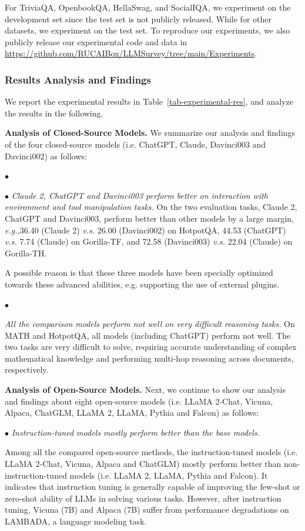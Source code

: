 {{For TriviaQA, OpenbookQA, HellaSwag, and SocialIQA, we experiment on the development set since the test set is not publicly released. While for other datasets, we experiment on the test set. To reproduce our experiments, we also publicly release our experimental code and data in \url{https://github.com/RUCAIBox/LLMSurvey/tree/main/Experiments}. 

\subsubsection{Results Analysis and Findings} We report the experimental results in Table~\ref{tab-experimental-res}, and analyze the results in the following.

\textbf{Analysis of Closed-Source Models.} We summarize our analysis and findings of  {the four} closed-source models (i.e. ChatGPT, Claude, Davinci003 and Davinci002) as follows:

$\bullet$ 

$\bullet$ \emph{{Claude 2, ChatGPT and Davinci003} perform better on interaction with environment and tool manipulation tasks.} On the two evaluation tasks, Claude 2, ChatGPT and Davinci003, perform better than other models by a large margin, \emph{e.g.,}36.40 (Claude 2) \emph{v.s.} 26.00 (Davinci002) on HotpotQA, 44.53 (ChatGPT) \emph{v.s.} 7.74 (Claude) on Gorilla-TF, and 72.58 (Davinci003) \emph{v.s.} 22.04 (Claude) on Gorilla-TH. 

{A possible reason is that these three models have been specially optimized towards these advanced abilities, e.g. supporting the use of external plugins.  }

$\bullet$ 

\emph{All the comparison models perform not well on very difficult reasoning tasks.} On MATH and HotpotQA, all models (including ChatGPT) perform not well. The two tasks are very difficult to solve, requiring accurate understanding of complex mathematical knowledge and performing multi-hop reasoning across documents, respectively.

\textbf{Analysis of Open-Source Models.} Next, we continue to show our analysis and findings about eight open-source models (i.e. LLaMA 2-Chat, Vicuna, Alpaca, ChatGLM, LLaMA 2, LLaMA, Pythia and Falcon) as follows: 

$\bullet$ \emph{Instruction-tuned models mostly perform better than the base models.} 

{Among all the compared open-source methods, the instruction-tuned models (i.e. LLaMA 2-Chat, Vicuna, Alpaca and ChatGLM) mostly perform better than  non-instruction-tuned models (i.e. LLaMA 2, LLaMA, Pythia and Falcon).} It indicates that instruction tuning is generally capable of improving  the few-shot or zero-shot ability of LLMs in solving various tasks. However, after instruction tuning, Vicuna (7B) and Alpaca (7B) suffer from performance degradations on LAMBADA, a language modeling task. 

}}
